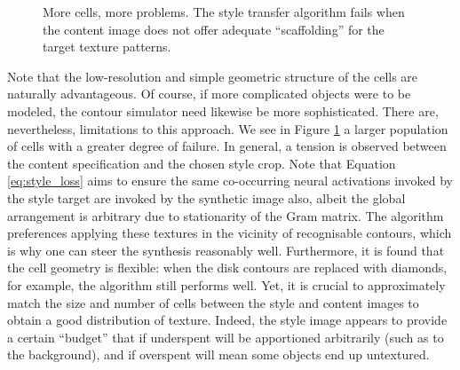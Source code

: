 \begin{figure}%
    \centering
    \qquad
    \qquad
    \caption{More cells, more problems. The style transfer algorithm fails when the content image does not offer adequate ``scaffolding'' for the target texture patterns.}%
    \label{fig:style_transfer_cells_many}%
\end{figure}

Note that the low-resolution and simple geometric structure of the cells are naturally advantageous. Of course, if more complicated objects were to be modeled, the contour simulator need likewise be more sophisticated. There are, nevertheless, limitations to this approach. We see in Figure \ref{fig:style_transfer_cells_many} a larger population of cells with a greater degree of failure. In general, a tension is observed between the content specification and the chosen style crop. Note that Equation \ref{eq:style_loss} aims to ensure the same co-occurring neural activations invoked by the style target are invoked by the synthetic image also, albeit the global arrangement is arbitrary due to stationarity of the Gram matrix. The algorithm preferences applying these textures in the vicinity of recognisable contours, which is why one can steer the synthesis reasonably well. Furthermore, it is found that the cell geometry is flexible: when the disk contours are replaced with diamonds, for example, the algorithm still performs well. Yet, it is crucial to approximately match the size and number of cells between the style and content images to obtain a good distribution of texture. Indeed, the style image appears to provide a certain ``budget'' that if underspent will be apportioned arbitrarily (such as to the background), and if overspent will mean some objects end up untextured.

